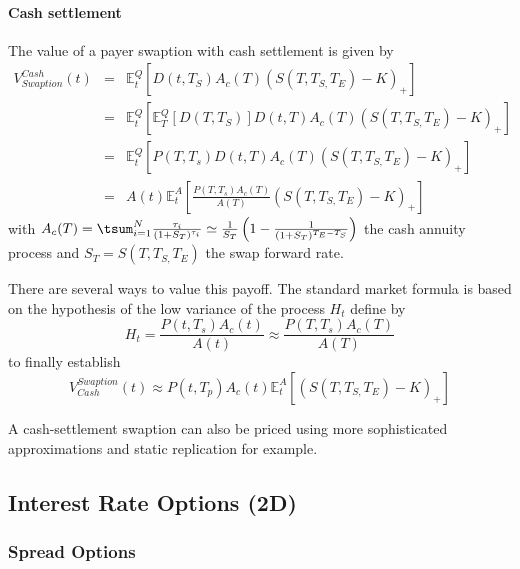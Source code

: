 \documentclass[3pt]{article}
\begin{document}
\paragraph{Cash settlement}

The value of a payer swaption with cash settlement is given by \bigskip 
\begin{eqnarray*}
V_{Swaption}^{Cash}(t) &=&\mathbb{E}_{t}^{Q}\left[ D(t,T_{S})A_{c}(T)\left(
S(T,T_{S,}T_{E})-K\right) _{+}\right] \\
&=&\mathbb{E}_{t}^{Q}\left[ \mathbb{E}_{T}^{Q}\left[ D(T,T_{S})\right]
D(t,T)A_{c}(T)\left( S(T,T_{S,}T_{E})-K\right) _{+}\right] \\
&=&\mathbb{E}_{t}^{Q}\left[ P(T,T_{s})D(t,T)A_{c}(T)\left(
S(T,T_{S,}T_{E})-K\right) _{+}\right] \\
&\mathbb{=}&A(t)\mathbb{E}_{t}^{A}\left[ \frac{P(T,T_{s})A_{c}(T)}{A(T)}%
\left( S(T,T_{S,}T_{E})-K\right) _{+}\right]
\end{eqnarray*}%
with $A_{c}(T)=\tsum_{i=1}^{N}\frac{\tau _{i}}{(1+S_{T})^{\tau _{i}}}\simeq 
\frac{1}{S_{T}}\left( 1-\frac{1}{(1+S_{T})^{T_{E}-T_{S}}}\right) $ the cash
annuity process and $S_{T}=S(T,T_{S,}T_{E})$ the swap forward rate.

\bigskip

\bigskip There are several ways to value this payoff. The standard market
formula is based on the hypothesis of the low variance of the process $H_{t}$
define by 
\begin{equation*}
H_{t}=\frac{P(t,T_{s})A_{c}(t)}{A(t)}\approx \frac{P(T,T_{s})A_{c}(T)}{A(T)}
\end{equation*}%
to finally establish\bigskip 
\begin{equation*}
V_{Cash}^{Swaption}(t)\approx P(t,T_{p})A_{c}(t)\mathbb{E}_{t}^{A}\left[
\left( S(T,T_{S,}T_{E})-K\right) _{+}\right]
\end{equation*}

A cash-settlement swaption can also be priced using more sophisticated
approximations and static replication for example.

\subsection{Interest Rate Options (2D)}

\subsubsection{Spread Options}
\end{document}
